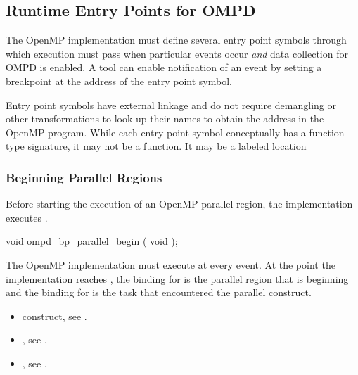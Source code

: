 \subsection{Runtime Entry Points for OMPD}
\label{subsec:runtime-entry-points-for-ompd}

The OpenMP implementation must define several entry point symbols 
through which execution must pass when particular events occur
\emph{and} data collection for OMPD is enabled. A tool can enable
notification of an event by setting a breakpoint at the address of 
the entry point symbol.

Entry point symbols have external  linkage and do not
require demangling or other transformations to look up their 
names to obtain the address in the OpenMP program. While each 
entry point symbol conceptually has a function type signature, 
it may not be a function. It may be a labeled location



\subsubsection{Beginning Parallel Regions}
\label{subsubsec:ompd_bp_parallel_begin}

\summary
Before starting the execution of an OpenMP parallel region, the 
implementation executes .

\format
\begin{cspecific}
\begin{ompSyntax}
void ompd_bp_parallel_begin ( void );
\end{ompSyntax}
\end{cspecific}

\descr
The OpenMP implementation must execute  
at every  event. At the point the implementation 
reaches , the binding for 
 is the parallel region that is 
beginning and the binding for 
is the task that encountered the parallel construct.

\crossreferences
\begin{itemize}
\item {} construct, see .

\item {}, 
see .

\item {}, 
see .
\end{itemize}



